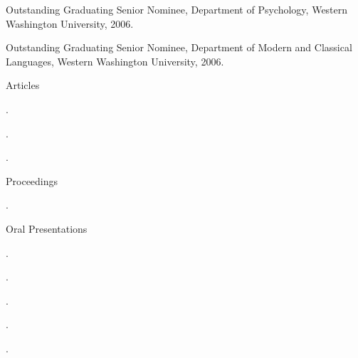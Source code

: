 \documentclass[11pt]{article}
\begin{document}
\noindent Outstanding Graduating Senior Nominee, Department of Psychology, Western Washington University, 2006. \\ \vspace{-0.1in}

\noindent Outstanding Graduating Senior Nominee, Department of Modern and Classical Languages, Western Washington University, 2006.


\bigskip


\nobibliography*

\noindent Articles \\ \vspace{-0.1in}

\noindent {}. \\ \vspace{-0.1in}

\noindent {}. \\ \vspace{-0.1in}

\noindent {}. \\ 


\medskip


\noindent Proceedings \\ \vspace{-0.1in}

\noindent {}. \\


\medskip


\noindent Oral Presentations \\ \vspace{-0.1in}

\noindent {}. \\ \vspace{-0.1in}

\noindent {}. \\ \vspace{-0.1in}

\noindent {}. \\ \vspace{-0.1in}

\noindent {}. \\ \vspace{-0.1in}

\noindent {}. \\ \vspace{-0.1in}
\end{document}
